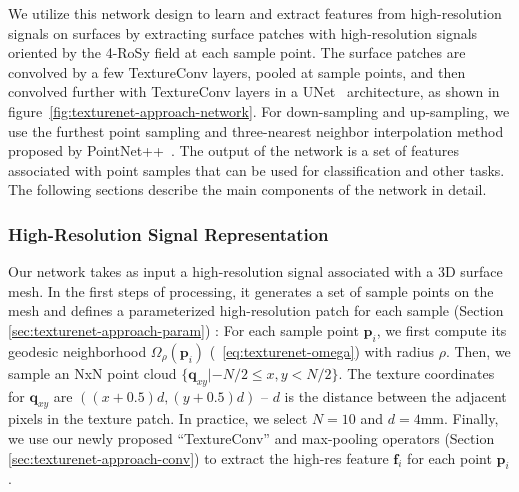 We utilize this network design to learn and extract features from high-resolution signals on surfaces by extracting surface patches with high-resolution signals oriented by the 4-RoSy field at each sample point.   The surface patches are convolved by a few TextureConv layers, pooled at sample points, and then convolved further with TextureConv layers in a UNet~\cite{ronneberger2015u} architecture, as shown in figure~\ref{fig:texturenet-approach-network}.  For down-sampling and up-sampling, we use the furthest point sampling and three-nearest neighbor interpolation method proposed by PointNet++~\cite{qi2017pointnet++}.  The output of the network is a set of features associated with point samples that can be used for classification and other tasks.   The following sections describe the main components of the network in detail.


\subsubsection{High-Resolution Signal Representation}
\label{sec:texturenet-high-res}
Our network takes as input a high-resolution signal associated with a 3D surface mesh. In the first steps of processing, it generates a set of sample points on the mesh and defines a parameterized high-resolution patch for each sample (Section \ref{sec:texturenet-approach-param}) : For each sample point $\mathbf{p}_i$, we first compute its geodesic neighborhood $\Omega_{\rho}(\mathbf{p}_i)$ (~\ref{eq:texturenet-omega}) with radius $\rho$. Then, we sample an NxN point cloud $\{\mathbf{q}_{xy}|-N/2\leq x,y<N/2\}$. The texture coordinates for $\mathbf{q}_{xy}$ are $((x+0.5)d,(y+0.5)d)$ -- $d$ is the distance between the adjacent pixels in the texture patch. In practice, we select $N=10$ and $d=4$mm. Finally, we use our newly proposed ``TextureConv'' and max-pooling operators (Section \ref{sec:texturenet-approach-conv}) to extract the high-res feature $\mathbf{f}_i$ for each point $\mathbf{p}_i$.  


